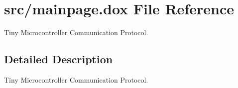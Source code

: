 \hypertarget{mainpage_8dox}{}\section{src/mainpage.dox File Reference}
\label{mainpage_8dox}


Tiny Microcontroller Communication Protocol.  




\subsection{Detailed Description}
Tiny Microcontroller Communication Protocol. 

